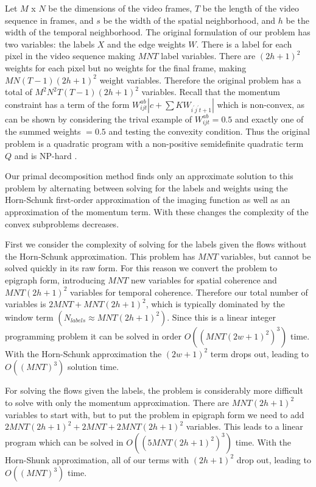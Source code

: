 Let $M$ x $N$ be the dimensions of the video frames, $T$ be the length of the video sequence in frames, and $s$ be the width of the spatial neighborhood, and $h$ be the width of the temporal neighborhood. The original formulation of our problem has two variables: the labels $X$ and the edge weights $W$. There is a label for each pixel in the video sequence making $M N T$ label variables. There are $(2 h + 1)^2$ weights for each pixel but no weights for the final frame, making $M N (T-1) (2 h + 1)^2$ weight variables. Therefore the original problem has a total of $M^2 N^2 T (T-1) (2 h + 1)^2$ variables. Recall that the momentum constraint has a term of the form $W_{ijt}^{ab} |c + \sum K W_{i^{'} j^{'} t+1} |$ which is non-convex, as can be shown by considering the trival example of $W_{ijt}^{ab} = 0.5$ and exactly one of the summed weights $= 0.5$ and testing the convexity condition. Thus the original problem is a quadratic program with a non-positive semidefinite quadratic term $Q$ and is NP-hard \cite{sahni1974computationally}.

Our primal decomposition method finds only an approximate solution to this problem by alternating between solving for the labels and weights using the Horn-Schunk first-order approximation of the imaging function as well as an approximation of the momentum term. With these changes the complexity of the convex subproblems decreases.

First we consider the complexity of solving for the labels given the flows without the Horn-Schunk approximation. This problem has $M N T$ variables, but cannot be solved quickly in its raw form. For this reason we convert the problem to epigraph form, introducing $M N T$ new variables for spatial coherence and $M N T (2 h + 1)^2$ variables for temporal coherence. Therefore our total number of variables is $2 M N T + M N T (2 h + 1)^2$, which is typically dominated by the window term $(N_{labels} \approx M N T (2 h + 1)^2)$. Since this is a linear integer programming problem it can be solved in order $O((M N T (2 w + 1)^2)^3)$ time. With the Horn-Schunk approximation the $(2 w + 1)^2$ term drops out, leading to $O((M N T)^3)$ solution time.

For solving the flows given the labels, the problem is considerably more difficult to solve with only the momentum approximation. There are $M N T (2 h + 1)^2$ variables to start with, but to put the problem in epigraph form we need to add $2 M N T (2 h + 1)^2 + 2 M N T + 2 M N T (2 h + 1)^2$ variables. This leads to a linear program which can be solved in 
$O((5 M N T (2 h + 1)^2)^3)$ time. With the Horn-Shunk approximation, all of our terms with $(2 h + 1)^2$ drop out, leading to $O((M N T)^3)$ time.

